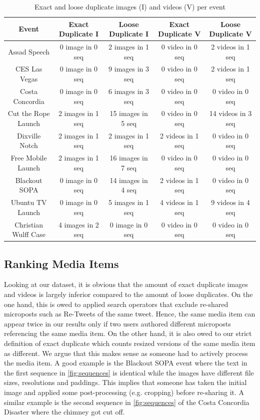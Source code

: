 \documentclass{acm_proc_article-sp}
\begin{document}
\begin{table}[htbp]
  \begin{tabular}{|c|c|c||c|c|}
    \hline
    \textbf{Event} & \textbf{Exact Duplicate I} & \textbf{Loose Duplicate I} & \textbf{Exact Duplicate V} & \textbf{Loose Duplicate V}\\
    \hline
    Assad Speech & 0 image in 0 seq & 2 images in 1 seq & 0 video in 0 seq & 2 videos in 1 seq\\
    CES Las Vegas & 0 image in 0 seq & 9 images in 3 seq & 0 video in 0 seq & 2 videos in 1 seq\\
    Costa Concordia & 0 image in 0 seq & 6 images in 3 seq & 0 video in 0 seq & 0 video in 0 seq\\
    Cut the Rope Launch & 2 images in 1 seq & 15 images in 5 seq & 0 video in 0 seq & 14 videos in 3 seq\\
    Dixville Notch & 2 images in 1 seq & 2 images in 1 seq & 2 videos in 1 seq & 0 video in 0 seq\\
    Free Mobile Launch & 2 images in 1 seq & 16 images in 7 seq & 0 video in 0 seq & 0 video in 0 seq\\
    Blackout SOPA & 0 image in 0 seq & 14 images in 4 seq & 2 videos in 1 seq & 0 video in 0 seq\\
    Ubuntu TV Launch & 0 image in 0 seq & 5 images in 1 seq & 4 videos in 1 seq & 9 videos in 4 seq\\
    Christian Wulff Case & 4 images in 2 seq & 0 image in 0 seq & 0 video in 0 seq & 0 video in 0 seq\\
    \hline
  \end{tabular}
  \label{tab:duplicate-media}
  \caption{Exact and loose duplicate images (I) and videos (V) per event}
\end{table}

\subsection{Ranking Media Items}
Looking at our dataset, it is obvious that the amount of exact duplicate images and videos is largely inferior compared to the amount of loose duplicates. On the one hand, this is owed to applied search operators that exclude re-shared microposts such as Re-Tweets of the same tweet. Hence, the same media item can appear twice in our results only if two users authored different microposts referencing the same media item. On the other hand, it is also owed to our strict definition of exact duplicate which counts resized versions of the same media item as different. We argue that this makes sense as someone had to actively process the media item. A good example is the Blackout SOPA event where the text in the first sequence in \autoref{fig:sequences} is identical while the images have different file sizes, resolutions and paddings. This implies that someone has taken the initial image and applied some post-processing (e.g. cropping) before re-sharing it. A similar example is the second sequence in \autoref{fig:sequences} of the Costa Concordia Disaster where the chimney got cut off.
\end{document}
